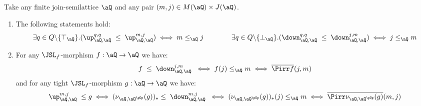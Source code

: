 \documentclass{article}
\begin{document}
\begin{lemma}
\label{lem:spec_mor_q_q}
\item
Take any finite join-semilattice $\aQ$ and any pair $(m,j) \in M(\aQ) \times J(\aQ)$.
\item
\begin{enumerate}
\item
The following statements hold:
\[
\exists q \in Q\backslash\{\top_\aQ\}.(\up_{\aQ,\aQ}^{q,q} \;\leq\; \up_{\aQ,\aQ}^{m,j})
\iff
m \leq_\aQ j
\qquad\qquad
\exists q \in Q\backslash\{\bot_\aQ\}.(\down_{\aQ,\aQ}^{q,q} \;\leq\; \down_{\aQ,\aQ}^{j,m})
\iff
j\leq_\aQ m
\]

\item
For any $\JSL_f$-morphism $f : \aQ \to \aQ$ we have:
\[
f \;\leq \; \down_{\aQ,\aQ}^{j,m} \;
\iff
f(j) \leq_\aQ m
\iff
\overline{\Pirr f}(j,m)
\]
and for any tight $\JSL_f$-morphism $g : \aQ \to \aQ$ we have:
\[
\up_{\aQ,\aQ}^{m,j} \; \leq g
\iff
(\nu_{\aQ,\aQ^{\pOp}}(g))_* \leq \; \down_{\aQ,\aQ}^{m,j} \;
\iff
(\nu_{\aQ,\aQ^{\pOp}}(g))_*(j) \leq_\aQ m
\iff
\overline{\Pirr \nu_{\aQ,\aQ^{\pOp}}(g)}(m,j)
\]


\end{enumerate}
\end{lemma}
\end{document}
